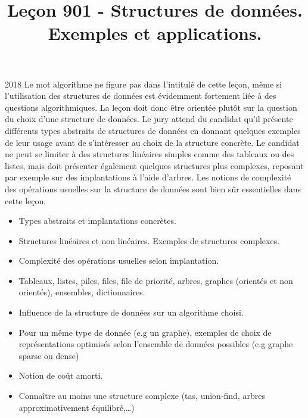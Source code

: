 \documentclass{agregfiche}
\title{Leçon 901 - Structures de données. Exemples et applications.}
\begin{document}
\maketitle

\secrapports
\begin{rapport}{2018}
	Le mot algorithme ne figure pas dans l’intitulé de cette leçon, même si l’utilisation des structures de
	données est évidemment fortement liée à des questions algorithmiques. La leçon doit donc être orientée
	plutôt sur la question du choix d’une structure de données. Le jury attend du candidat qu’il présente
	différents types abstraits de structures de données en donnant quelques exemples de leur usage avant de
	s’intéresser au choix de la structure concrète. Le candidat ne peut se limiter à des structures linéaires
	simples comme des tableaux ou des listes, mais doit présenter également quelques structures plus
	complexes, reposant par exemple sur des implantations à l’aide d’arbres. Les notions de complexité des
	opérations usuelles sur la structure de données sont bien sûr essentielles dans cette leçon.
\end{rapport}

\secindispensables

\begin{itemize}
	\item  Types abstraits et implantations concrètes.
    \item Structures linéaires et non linéaires. Exemples de structures complexes.
	\item Complexité des opérations usuelles selon implantation.
\end{itemize}

\secasavoir

\begin{itemize}
	\item  Tableaux, listes, piles, files, file de priorité, arbres, graphes (orientés et non orientés), ensembles, dictionnaires.
    \item Influence de la structure de données sur un algorithme choisi.
    \item Pour un même type de donnée (e.g un graphe), exemples de choix de représentations optimisés selon l'ensemble de données possibles (e.g graphe sparse ou dense)
	\item Notion de coût amorti.
    \item Connaître au moins une structure complexe (tas, union-find, arbres approximativement équilibré,\dots)
	
\end{itemize}
\end{document}
